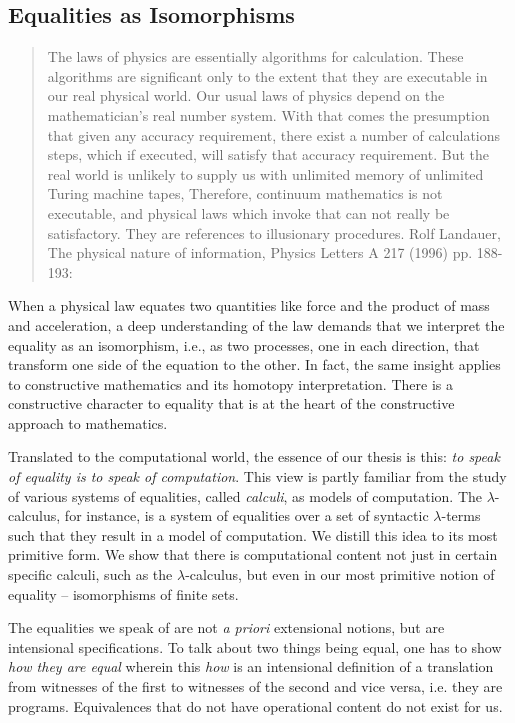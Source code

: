 \documentclass{article}
\newcommand{\lcal}{\ensuremath{\lambda}-calculus}
\begin{document}
\subsection{Equalities as Isomorphisms}

\begin{quote}
  The laws of physics are essentially algorithms for calculation. These
  algorithms are significant only to the extent that they are executable in
  our real physical world. Our usual laws of physics depend on the
  mathematician's real number system. With that comes the presumption that
  given any accuracy requirement, there exist a number of calculations steps,
  which if executed, will satisfy that accuracy requirement. But the real
  world is unlikely to supply us with unlimited memory of unlimited Turing
  machine tapes, Therefore, continuum mathematics is not executable, and
  physical laws which invoke that can not really be satisfactory. They are
  references to illusionary procedures. Rolf Landauer, The physical nature of
  information, Physics Letters A 217 (1996) pp. 188-193:
\end{quote} 

When a physical law equates two quantities like force and the product of mass
and acceleration, a deep understanding of the law demands that we interpret
the equality as an isomorphism, i.e., as two processes, one in each
direction, that transform one side of the equation to the other. In fact, the
same insight applies to constructive mathematics and its homotopy
interpretation. There is a constructive character to equality that is at the
heart of the constructive approach to mathematics. 

Translated to the computational world, the essence of our thesis is this:
\emph{to speak of equality is to speak of computation}. This view is partly
familiar from the study of various systems of equalities, called
\emph{calculi}, as models of computation. The \lcal, for instance, is a
system of equalities over a set of syntactic $\lambda$-terms such that they
result in a model of computation. We distill this idea to its most primitive
form. We show that there is computational content not just in certain
specific calculi, such as the \lcal, but even in our most primitive notion of
equality -- isomorphisms of finite sets.

The equalities we speak of are not \emph{a priori} extensional
notions, but are intensional specifications. To talk about two things
being equal, one has to show \emph{how they are equal} wherein this
\emph{how} is an intensional definition of a translation from
witnesses of the first to witnesses of the second and vice versa,
i.e. they are programs. Equivalences that do not have operational
content do not exist for us.
\end{document}

